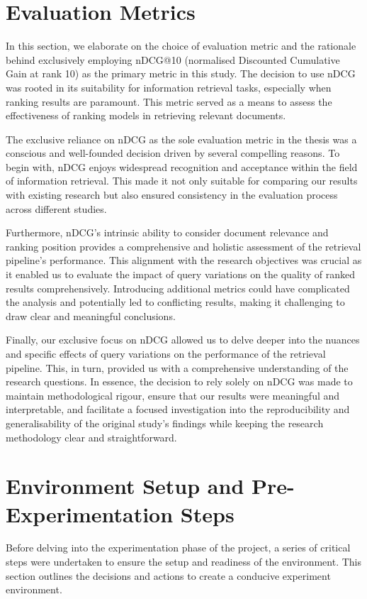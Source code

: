 \section{Evaluation Metrics}
In this section, we elaborate on the choice of evaluation metric and the rationale behind exclusively employing nDCG@10 (normalised Discounted Cumulative Gain at rank 10) as the primary metric in this study. The decision to use nDCG was rooted in its suitability for information retrieval tasks, especially when ranking results are paramount. This metric served as a means to assess the effectiveness of ranking models in retrieving relevant documents.

The exclusive reliance on nDCG as the sole evaluation metric in the thesis was a conscious and well-founded decision driven by several compelling reasons. To begin with, nDCG enjoys widespread recognition and acceptance within the field of information retrieval. This made it not only suitable for comparing our results with existing research but also ensured consistency in the evaluation process across different studies.

Furthermore, nDCG's intrinsic ability to consider document relevance and ranking position provides a comprehensive and holistic assessment of the retrieval pipeline's performance. This alignment with the research objectives was crucial as it enabled us to evaluate the impact of query variations on the quality of ranked results comprehensively. Introducing additional metrics could have complicated the analysis and potentially led to conflicting results, making it challenging to draw clear and meaningful conclusions.

Finally, our exclusive focus on nDCG allowed us to delve deeper into the nuances and specific effects of query variations on the performance of the retrieval pipeline. This, in turn, provided us with a comprehensive understanding of the research questions. In essence, the decision to rely solely on nDCG was made to maintain methodological rigour, ensure that our results were meaningful and interpretable, and facilitate a focused investigation into the reproducibility and generalisability of the original study's findings while keeping the research methodology clear and straightforward.

\section{Environment Setup and Pre-Experimentation Steps}
Before delving into the experimentation phase of the project, a series of critical steps were undertaken to ensure the setup and readiness of the environment. This section outlines the decisions and actions to create a conducive experiment environment.

